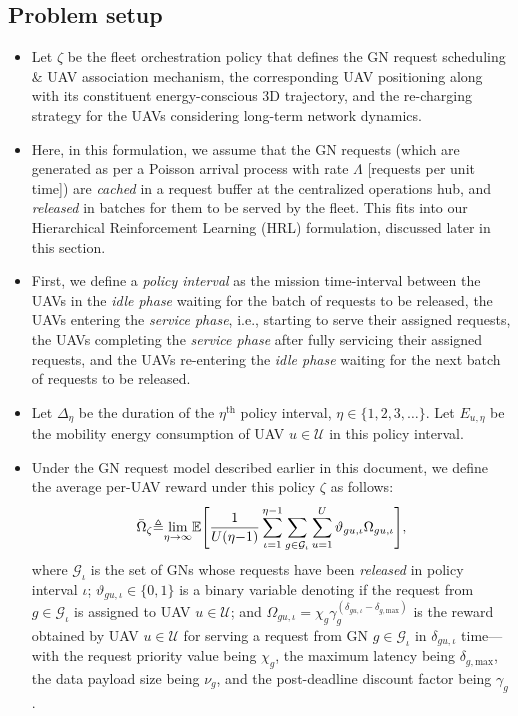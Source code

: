 \documentclass{article}
\begin{document}
\subsection{Problem setup}
\begin{itemize}
    \item Let $\zeta$ be the fleet orchestration policy that defines the GN request scheduling \& UAV association mechanism, the corresponding UAV positioning along with its constituent energy-conscious $3$D trajectory, and the re-charging strategy for the UAVs considering long-term network dynamics.
    \item Here, in this formulation, we assume that the GN requests (which are generated as per a Poisson arrival process with rate $\Lambda$ [requests per unit time]) are \emph{cached} in a request buffer at the centralized operations hub, and \emph{released} in batches for them to be served by the fleet. This fits into our Hierarchical Reinforcement Learning (HRL) formulation, discussed later in this section.
    \item First, we define a \emph{policy interval} as the mission time-interval between the UAVs in the \emph{idle phase} waiting for the batch of requests to be released, the UAVs entering the \emph{service phase}, i.e., starting to serve their assigned requests, the UAVs completing the \emph{service phase} after fully servicing their assigned requests, and the UAVs re-entering the \emph{idle phase} waiting for the next batch of requests to be released.
    \item Let $\Delta_{\eta}$ be the duration of the $\eta^{\mathrm{th}}$ policy interval, $\eta{\in}\{1,2,3,{\dots}\}$. Let $E_{u,\eta}$ be the mobility energy consumption of UAV $u{\in}\mathcal{U}$ in this policy interval.
    \item Under the GN request model described earlier in this document, we define the average per-UAV reward under this policy $\zeta$ as follows:
    \begin{align}\label{Average_reward}
        \Bar{\Omega}_{\zeta}{\triangleq}\underset{\eta{\rightarrow}\infty}{\mathrm{lim}}\mathbb{E}\Bigg[\frac{1}{U(\eta{-}1)}\sum_{\iota{=}1}^{\eta{-}1}\sum_{g{\in}\mathcal{G}_{\iota}}\sum_{u{=}1}^{U}\vartheta_{gu,\iota}\Omega_{gu,\iota}\Bigg],
    \end{align}
    where $\mathcal{G}_{\iota}$ is the set of GNs whose requests have been \emph{released} in policy interval $\iota$; $\vartheta_{gu,\iota}{\in}\{0,1\}$ is a binary variable denoting if the request from $g{\in}\mathcal{G}_{\iota}$ is assigned to UAV $u{\in}\mathcal{U}$; and $\Omega_{gu,\iota}{=}\chi_{g}\gamma_{g}^{\left(\delta_{gu,\iota}{-}\delta_{g,\mathrm{max}}\right)}$ is the reward obtained by UAV $u{\in}\mathcal{U}$ for serving a request from GN $g{\in}\mathcal{G}_{\iota}$ in $\delta_{gu,\iota}$ time---with the request priority value being $\chi_{g}$, the maximum latency being $\delta_{g,\mathrm{max}}$, the data payload size being $\nu_{g}$, and the post-deadline discount factor being $\gamma_{g}$.

\end{itemize}
\end{document}
